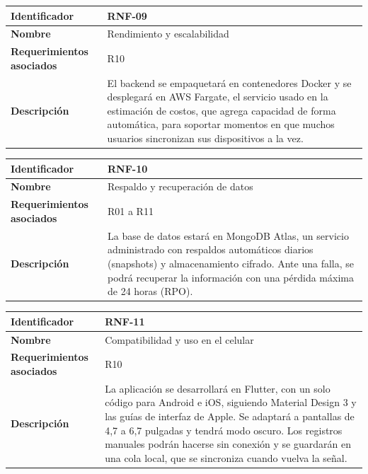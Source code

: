 \begin{table}[h!]
    \centering
    \renewcommand{\arraystretch}{1.3}
    \begin{tabular}{|p{3.5cm}|p{11.5cm}|}
        \hline
        \rowcolor[HTML]{EFEFEF}
        \textbf{Identificador} & \textbf{RNF-09} \\ \hline
        \textbf{Nombre} & Rendimiento y escalabilidad \\ \hline
        \textbf{Requerimientos asociados} & R10 \\ \hline
        \textbf{Descripción} & El backend se empaquetará en contenedores Docker y se desplegará en AWS Fargate, el servicio usado en la estimación de costos, que agrega capacidad de forma automática, para soportar momentos en que muchos usuarios sincronizan sus dispositivos a la vez. \\ \hline
    \end{tabular}
\end{table}

\begin{table}[h!]
    \centering
    \renewcommand{\arraystretch}{1.3}
    \begin{tabular}{|p{3.5cm}|p{11.5cm}|}
        \hline
        \rowcolor[HTML]{EFEFEF}
        \textbf{Identificador} & \textbf{RNF-10} \\ \hline
        \textbf{Nombre} & Respaldo y recuperación de datos \\ \hline
        \textbf{Requerimientos asociados} & R01 a R11 \\ \hline
        \textbf{Descripción} & La base de datos estará en MongoDB Atlas, un servicio administrado con respaldos automáticos diarios (snapshots) y almacenamiento cifrado. Ante una falla, se podrá recuperar la información con una pérdida máxima de 24 horas (RPO). \\ \hline
    \end{tabular}
\end{table}
\newpage
\begin{table}[h!]
    \centering
    \renewcommand{\arraystretch}{1.3}
    \begin{tabular}{|p{3.5cm}|p{11.5cm}|}
        \hline
        \rowcolor[HTML]{EFEFEF}
        \textbf{Identificador} & \textbf{RNF-11} \\ \hline
        \textbf{Nombre} & Compatibilidad y uso en el celular \\ \hline
        \textbf{Requerimientos asociados} & R10 \\ \hline
        \textbf{Descripción} & La aplicación se desarrollará en Flutter, con un solo código para Android e iOS, siguiendo Material Design 3 y las guías de interfaz de Apple. Se adaptará a pantallas de 4,7 a 6,7 pulgadas y tendrá modo oscuro. Los registros manuales podrán hacerse sin conexión y se guardarán en una cola local, que se sincroniza cuando vuelva la señal. \\ \hline
    \end{tabular}
\end{table}

